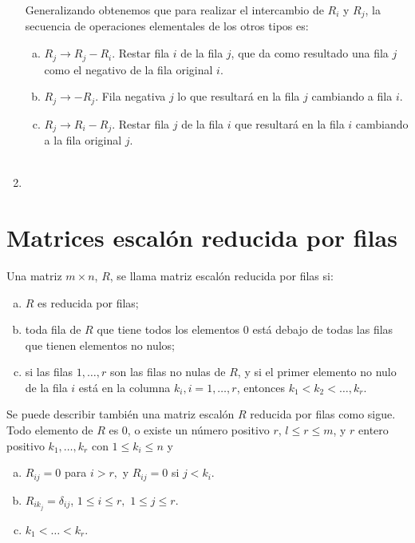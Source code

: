 \begin{enumerate}[\bfseries 1.]
	Generalizando obtenemos que para realizar el intercambio de $R_i$ y $R_j$, la secuencia de operaciones elementales de los otros tipos es: 

	\begin{enumerate}[a)]
	    \item $R_j\to R_j-R_i$. Restar fila $i$ de la fila $j$, que da como resultado una fila $j$ como el negativo de la fila original $i$.
	    \item $R_j\to -R_j$. Fila negativa $j$ lo que resultará en la fila $j$ cambiando a fila $i$.
	    \item $R_j\to R_i-R_j$. Restar fila $j$ de la fila $i$ que resultará en la fila $i$ cambiando a la fila original $j$.\\\\
	\end{enumerate}

    \item 

\end{enumerate}


\section{Matrices escalón reducida por filas}

    \begin{def.}
	Una matriz $m\times n$, $R$, se llama matriz escalón reducida por filas si:
	\begin{enumerate}[(a)]
	    \item $R$ es reducida por filas;
	    \item toda fila de $R$ que tiene todos los elementos $0$ está debajo de todas las filas que tienen elementos no nulos;
	    \item si las filas $1,\ldots, r$ son las filas no nulas de $R$, y si el primer elemento no nulo de la fila $i$ está en la columna $k_i, i=1,\ldots, r$, entonces $k_1<k_2<\ldots,k_r.$
	\end{enumerate}
	Se puede describir también una matriz escalón $R$ reducida por filas como sigue. Todo elemento de $R$ es $0$, o existe un número positivo $r$, $l\leq r \leq m$, y $r$ entero positivo $k_1,\ldots ,k_r$ con $1\leq k_i\leq n$ y
	\begin{enumerate}[(a)]
	    \item $R_{ij}=0$ para $i>r,$ y $R_{ij}=0$ si $j<k_i$.
	    \item $R_{ik_j}=\delta_{ij}$, $1\leq i \leq r,$ $1\leq j\leq r$.
	    \item $k_1<\ldots < k_r$.
	\end{enumerate}
    \end{def.}

